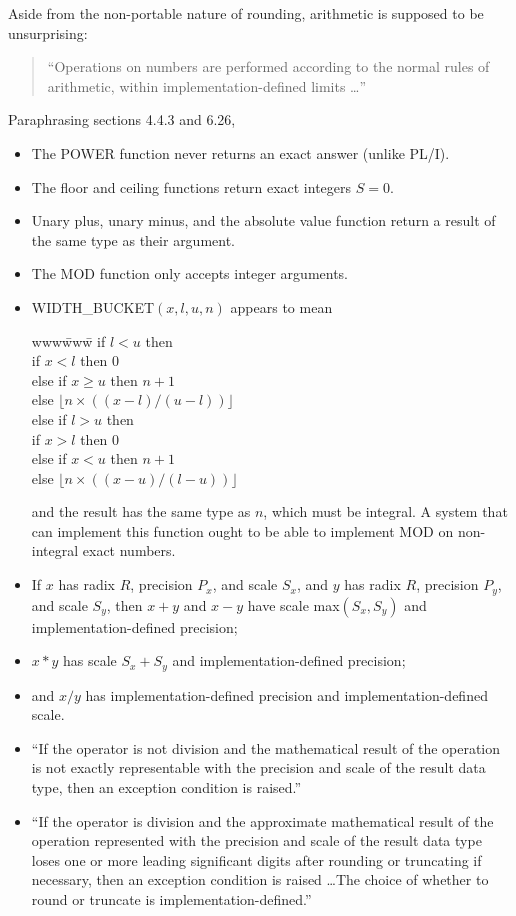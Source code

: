 \documentclass{article}
\begin{document}
Aside from the non-portable nature of rounding,
arithmetic is supposed to be unsurprising:
\begin{quote}
``Operations on numbers are performed according to the normal
rules of arithmetic, within implementation-defined limits \dots''
\end{quote}

Paraphrasing sections 4.4.3 and 6.26,
\begin{itemize}
\item The POWER function never returns an exact answer (unlike PL/I).
\item The floor and ceiling functions return exact integers $S=0$.
\item Unary plus, unary minus, and the absolute value function return a result
of the same type as their argument.
\item  The MOD function only accepts integer arguments.
\item WIDTH\_BUCKET$(x, l, u, n)$ appears to mean
\begin{tabbing}
www\=www\=\kill
if $l < u$ then\\
\> if $x<l$ then 0\\
\> else if $x \ge u$ then $n+1$\\
\> else $\lfloor n\times((x-l)/(u-l)) \rfloor$\\
else if $l > u$ then\\
\> if $x > l$ then 0\\
\> else if $x < u$ then $n+1$\\
\> else $\lfloor n\times((x-u)/(l-u)) \rfloor$\\
\end{tabbing}
and the result has the same type as $n$, which must be integral.
A system that can implement this function ought to be able to
implement MOD on non-integral exact numbers.
\item If $x$ has radix $R$, precision $P_x$, and scale $S_x$,
and $y$ has radix $R$, precision $P_y$, and scale $S_y$,
then $x+y$ and $x-y$ have scale max$(S_x,S_y)$ and
implementation-defined precision;
\item $x*y$ has scale $S_x+S_y$ and implementation-defined precision;
\item and $x/y$ has implementation-defined precision and
implementation-defined scale.
\item ``If the operator is not division and the mathematical result of
the operation is not exactly representable with the precision and scale
of the result data type, then an exception condition is raised.''
\item ``If the operator is division and the approximate mathematical
result of the operation represented with the precision and scale of the
result data type loses one or more leading significant digits after
rounding or truncating if necessary, then an exception condition is
raised \dots The choice of whether to round or truncate is
implementation-defined.''
\end{itemize}
\end{document}
